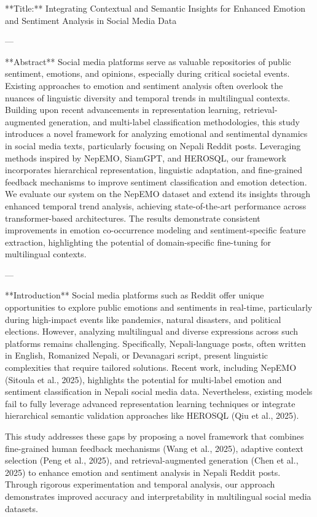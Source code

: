 **Title:** Integrating Contextual and Semantic Insights for Enhanced Emotion and Sentiment Analysis in Social Media Data  

---

**Abstract**  
Social media platforms serve as valuable repositories of public sentiment, emotions, and opinions, especially during critical societal events. Existing approaches to emotion and sentiment analysis often overlook the nuances of linguistic diversity and temporal trends in multilingual contexts. Building upon recent advancements in representation learning, retrieval-augmented generation, and multi-label classification methodologies, this study introduces a novel framework for analyzing emotional and sentimental dynamics in social media texts, particularly focusing on Nepali Reddit posts. Leveraging methods inspired by NepEMO, SiamGPT, and HEROSQL, our framework incorporates hierarchical representation, linguistic adaptation, and fine-grained feedback mechanisms to improve sentiment classification and emotion detection. We evaluate our system on the NepEMO dataset and extend its insights through enhanced temporal trend analysis, achieving state-of-the-art performance across transformer-based architectures. The results demonstrate consistent improvements in emotion co-occurrence modeling and sentiment-specific feature extraction, highlighting the potential of domain-specific fine-tuning for multilingual contexts.

---

**Introduction**  
Social media platforms such as Reddit offer unique opportunities to explore public emotions and sentiments in real-time, particularly during high-impact events like pandemics, natural disasters, and political elections. However, analyzing multilingual and diverse expressions across such platforms remains challenging. Specifically, Nepali-language posts, often written in English, Romanized Nepali, or Devanagari script, present linguistic complexities that require tailored solutions. Recent work, including NepEMO (Sitoula et al., 2025), highlights the potential for multi-label emotion and sentiment classification in Nepali social media data. Nevertheless, existing models fail to fully leverage advanced representation learning techniques or integrate hierarchical semantic validation approaches like HEROSQL (Qiu et al., 2025).

This study addresses these gaps by proposing a novel framework that combines fine-grained human feedback mechanisms (Wang et al., 2025), adaptive context selection (Peng et al., 2025), and retrieval-augmented generation (Chen et al., 2025) to enhance emotion and sentiment analysis in Nepali Reddit posts. Through rigorous experimentation and temporal analysis, our approach demonstrates improved accuracy and interpretability in multilingual social media datasets.

